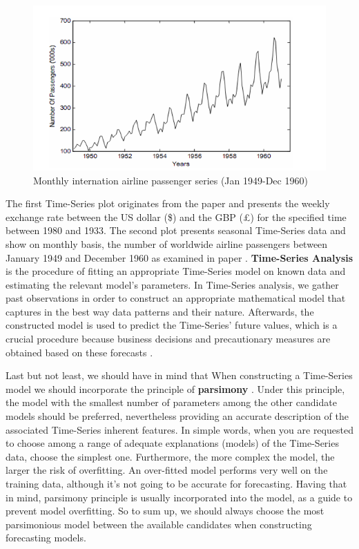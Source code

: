 \begin{figure}[htbp]
\centering
\includegraphics[width=0.8\linewidth]{project/fd1.PNG}

\caption{Monthly internation airline passenger series (Jan 1949-Dec 1960)}
\end{figure} The first Time-Series plot originates from the paper \cite{zhang2003time} and presents the weekly exchange rate between the US dollar (\$) and the GBP (\pounds) for the specified time between 1980 and 1933. The second plot presents seasonal Time-Series data and show on monthly basis, the number of worldwide airline passengers between January 1949 and December 1960 as examined in paper \cite{adhikari2013introductory}.
\textbf{Time-Series Analysis} is the procedure of fitting an appropriate Time-Series model on known data and estimating the relevant model's parameters. In Time-Series analysis, we gather past observations in order to construct an appropriate mathematical model that captures in the best way data patterns and their nature. Afterwards, the constructed model is used to predict the Time-Series' future values, which is a crucial procedure because business decisions and precautionary measures are obtained based on these forecasts .
\par Last but not least, we should have in mind that When constructing a Time-Series model we should incorporate the principle of \textbf{parsimony} \cite{provost2013data}. 
Under this principle, the model with the smallest number of parameters among the other candidate models should be preferred, nevertheless providing an accurate description of the associated Time-Series inherent features. In simple words, when you are requested to choose among a range of adequate explanations (models) of the Time-Series data, choose the simplest one. Furthermore, the more complex the model, the larger the risk of overfitting.
An over-fitted model performs very well on the training data, although it's not going to be accurate for forecasting. Having that in mind, parsimony principle is usually incorporated into the model, as a guide to prevent model overfitting. So to sum up, we should always choose the most parsimonious model between the available candidates when constructing forecasting models.

